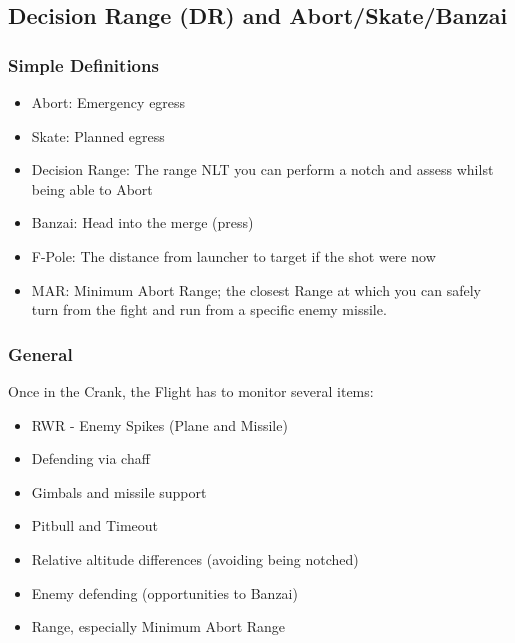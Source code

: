 \subsection{Decision Range (DR) and Abort/Skate/Banzai}

\subsubsection*{Simple Definitions}

\begin{itemize}
  \item Abort: Emergency egress

  \item Skate: Planned egress

  \item Decision Range: The range NLT you can perform a notch and assess whilst
    being able to Abort

  \item Banzai: Head into the merge (press)

  \item F-Pole: The distance from launcher to target if the shot were now

  \item MAR: Minimum Abort Range; the closest Range at which you can safely
    turn from the fight and run from a specific enemy missile.

\end{itemize}

\subsubsection*{General}

Once in the Crank, the Flight has to monitor several items:

\begin{itemize}
  \item RWR - Enemy Spikes (Plane and Missile)
  \item Defending via chaff
  \item Gimbals and missile support
  \item Pitbull and Timeout
  \item Relative altitude differences (avoiding being notched)
  \item Enemy defending (opportunities to Banzai)
  \item Range, especially Minimum Abort Range
\end{itemize}

